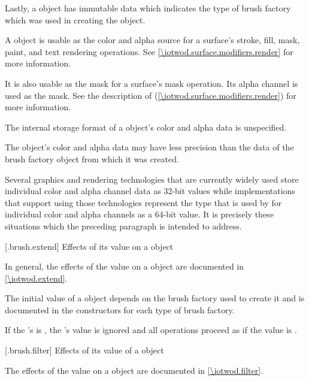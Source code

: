 \pnum
Lastly, a  object has immutable  data which indicates the type of brush factory which was used in creating the  object.

\pnum
A  object is usable as the color and alpha source for a surface's stroke, fill, mask, paint, and text rendering operations. See \ref{\iotwod.surface.modifiers.render} for more information.

\pnum
It is also usable as the mask for a surface's mask operation. Its alpha channel is used as the mask. See the description of  (\ref{\iotwod.surface.modifiers.render}) for more information.

\pnum
The internal storage format of a  object's color and alpha data is unspecified.

\pnum
The  object's color and alpha data may have less precision than the data of the brush factory object from which it was created.

\pnum
\enterexample
Several graphics and rendering technologies that are currently widely used store individual color and alpha channel data as 32-bit  values while \Cpp implementations that support using those technologies represent the  type that is used by  for individual color and alpha channels as a 64-bit value. It is precisely these situations which the preceding paragraph is intended to address.
\exitexample

 [\iotwod.brush.extend] {Effects of its  value on a  object}

\pnum
In general, the effects of the  value on a  object are documented in \ref{\iotwod.extend}.

\pnum
The initial  value of a  object depends on the brush factory used to create it and is documented in the  constructors for each type of brush factory.

\pnum
If the 's  is , the 's  value is ignored and all operations proceed as if the  value is .

 [\iotwod.brush.filter] {Effects of its  value of a  object}

\pnum
The effects of the  value on a  object are documented in \ref{\iotwod.filter}.

